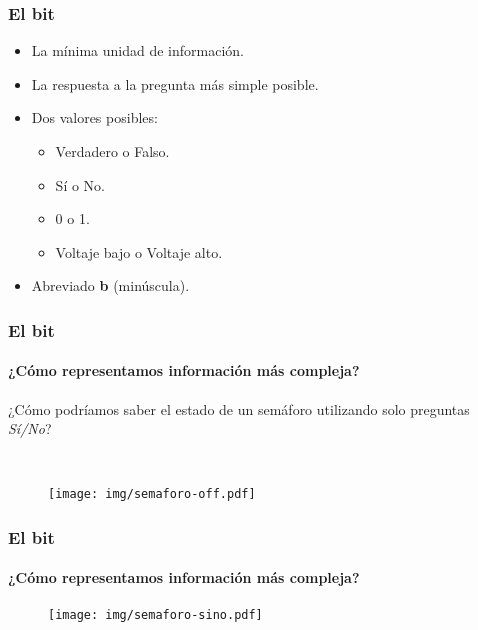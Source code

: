 \documentclass[11pt,a4paper,spanish]{beamer}
\newcommand{\bit}{\textbf{b}}
\begin{document}
\begin{frame}

\frametitle{El bit}

\begin{itemize}
    \item La mínima unidad de información.
    \item La respuesta a la pregunta más simple posible.
    \item Dos valores posibles:
        \begin{itemize}
            \item Verdadero o Falso.
            \item Sí o No.
            \item 0 o 1.
            \item Voltaje bajo o Voltaje alto.
        \end{itemize}
    \item Abreviado \bit{} (minúscula).
\end{itemize}
\end{frame}

\begin{frame}

\frametitle{El bit}
\framesubtitle{¿Cómo representamos información más compleja?}

\begin{minipage}{0.80\textwidth}
    ¿Cómo podríamos saber el estado de un semáforo utilizando solo preguntas
    \emph{Sí/No}?
\end{minipage}
~
\begin{minipage}{0.15\textwidth}
    \begin{figure}
    \centering
        \texttt{[image: img/semaforo-off.pdf]}
        \captionsetup{textfont=tiny,labelformat=empty}
        \caption{}
    \end{figure}
\end{minipage}

\end{frame}

\begin{frame}

\frametitle{El bit}
\framesubtitle{¿Cómo representamos información más compleja?}

\begin{figure}
\centering
    \texttt{[image: img/semaforo-sino.pdf]}
    \captionsetup{labelformat=empty}
    \caption{}
\end{figure}

\end{frame}
\end{document}
